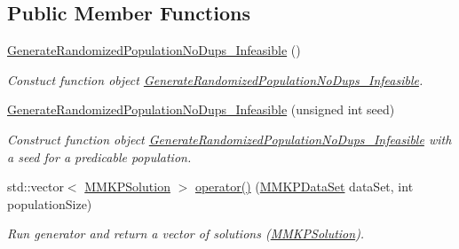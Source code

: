 \subsection*{Public Member Functions}
\begin{DoxyCompactItemize}
\item 
\hypertarget{class_generate_randomized_population_no_dups___infeasible_a059a40654b381b09fc833bcbaee00499}{\hyperlink{class_generate_randomized_population_no_dups___infeasible_a059a40654b381b09fc833bcbaee00499}{Generate\+Randomized\+Population\+No\+Dups\+\_\+\+Infeasible} ()}\label{class_generate_randomized_population_no_dups___infeasible_a059a40654b381b09fc833bcbaee00499}

\begin{DoxyCompactList}\small\item\em Constuct function object \hyperlink{class_generate_randomized_population_no_dups___infeasible}{Generate\+Randomized\+Population\+No\+Dups\+\_\+\+Infeasible}. \end{DoxyCompactList}\item 
\hypertarget{class_generate_randomized_population_no_dups___infeasible_a7a679a8fec57e8400511c874777502b4}{\hyperlink{class_generate_randomized_population_no_dups___infeasible_a7a679a8fec57e8400511c874777502b4}{Generate\+Randomized\+Population\+No\+Dups\+\_\+\+Infeasible} (unsigned int seed)}\label{class_generate_randomized_population_no_dups___infeasible_a7a679a8fec57e8400511c874777502b4}

\begin{DoxyCompactList}\small\item\em Construct function object \hyperlink{class_generate_randomized_population_no_dups___infeasible}{Generate\+Randomized\+Population\+No\+Dups\+\_\+\+Infeasible} with a seed for a predicable population. \end{DoxyCompactList}\item 
\hypertarget{class_generate_randomized_population_no_dups___infeasible_a18dc0daab30c2924f0f1596bd6e4ef48}{std\+::vector$<$ \hyperlink{class_m_m_k_p_solution}{M\+M\+K\+P\+Solution} $>$ \hyperlink{class_generate_randomized_population_no_dups___infeasible_a18dc0daab30c2924f0f1596bd6e4ef48}{operator()} (\hyperlink{class_m_m_k_p_data_set}{M\+M\+K\+P\+Data\+Set} data\+Set, int population\+Size)}\label{class_generate_randomized_population_no_dups___infeasible_a18dc0daab30c2924f0f1596bd6e4ef48}

\begin{DoxyCompactList}\small\item\em Run generator and return a vector of solutions (\hyperlink{class_m_m_k_p_solution}{M\+M\+K\+P\+Solution}). \end{DoxyCompactList}\end{DoxyCompactItemize}


